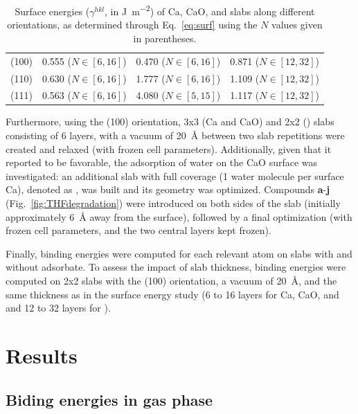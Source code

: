 \documentclass[journal=jpccck,manuscript=article]{achemso}
\begin{document}
\begin{table}[!h]
	\centering
	\begin{tabular}{lccc}
		\toprule
		&	\ce{Ca} & \ce{CaO} &	\ce{CaH2} \\
		\midrule
		(100) & 0.555 ($N\in[6,16]$) & 0.470 ($N\in[6,16]$) & 0.871  ($N\in[12,32]$)\\
		(110) & 0.630  ($N\in[6,16]$)& 1.777  ($N\in[6,16]$)& 1.109 ($N\in[12,32]$)\\
		(111) & 0.563  ($N\in[6,16]$) & 4.080  ($N\in[5,15]$)  & 1.117   ($N\in[12,32]$) \\ 
		\bottomrule
	\end{tabular}
	\caption{Surface energies ($\gamma^{hkl}$, in \si{\joule\per\meter\squared}) of Ca, CaO, and  slabs along different orientations, as determined through Eq.~\eqref{eq:surf} using the $N$ values given in parentheses.}
	\label{tab:surf}
\end{table}

Furthermore, using the (100) orientation, 3x3 (Ca and CaO) and 2x2 () slabs consisting of 6 layers, with a vacuum of \SI{20}{\angstrom} between two slab repetitions were created and relaxed (with frozen cell parameters). Additionally, given that it reported to be favorable\cite{deleeuwDensityFunctionalTheory2000,fujimoriInteractionWaterCaO2016a}, the adsorption of water on the CaO surface was investigated: an additional slab with full coverage (1 water molecule per surface Ca), denoted as , was built and its geometry was optimized. Compounds \textbf{a}-\textbf{j} (Fig.~\ref{fig:THFdegradation}) were introduced on both sides of the slab (initially approximately \SI{6}{\angstrom} away from the surface), followed by a final optimization (with frozen cell parameters, and the two central layers kept frozen). 

Finally, binding energies were computed for each relevant atom on slabs with and without  adsorbate. To assess the impact of slab thickness, binding energies were computed on 
2x2 slabs with the (100) orientation, a vacuum of \SI{20}{\angstrom},  and the same thickness  as in the surface energy study (6 to 16 layers for Ca, CaO, and  and 12 to 32 layers for ).

\section{Results}

\subsection{Biding energies in gas phase}
\end{document}
